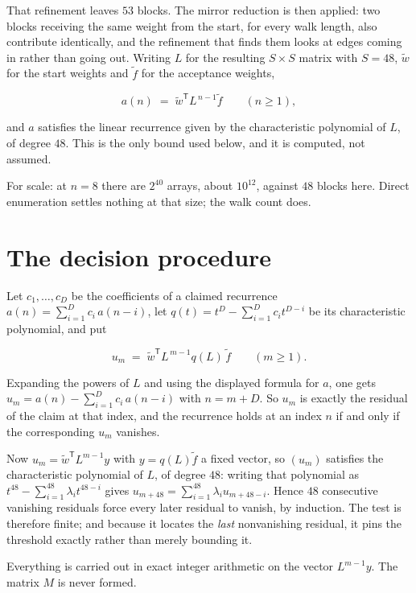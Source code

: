 \documentclass[11pt]{article}
\theoremstyle{definition}
\begin{document}
That refinement leaves $53$ blocks. The mirror reduction is then applied: two blocks receiving the same weight from the start, for every walk length, also contribute identically, and the refinement that finds them looks at edges coming in rather than going out. Writing $L$ for the resulting $S \times S$ matrix with $S = 48$, $\tilde w$ for the start weights and $\tilde f$ for the acceptance weights,

\[a(n) \;=\; \tilde w^{\mathsf T} L^{\,n-1} \tilde f \qquad (n \ge 1),\]

and $a$ satisfies the linear recurrence given by the characteristic polynomial of $L$, of degree $48$. This is the only bound used below, and it is computed, not assumed.

For scale: at $n = 8$ there are $2^{40}$ arrays, about $10^{12}$, against $48$ blocks here. Direct enumeration settles nothing at that size; the walk count does.

\section{The decision procedure}

Let $c_1,\dots,c_D$ be the coefficients of a claimed recurrence $a(n) = \sum_{i=1}^{D} c_i\,a(n-i)$, let $q(t) = t^{D} - \sum_{i=1}^{D} c_i t^{D-i}$ be its characteristic polynomial, and put

\[u_m \;=\; \tilde w^{\mathsf T} L^{\,m-1} q(L)\,\tilde f \qquad (m \ge 1).\]

Expanding the powers of $L$ and using the displayed formula for $a$, one gets $u_m = a(n) - \sum_{i=1}^{D} c_i\,a(n-i)$ with $n = m + D$. So $u_m$ is exactly the residual of the claim at that index, and the recurrence holds at an index $n$ if and only if the corresponding $u_m$ vanishes.

Now $u_m = \tilde w^{\mathsf T} L^{m-1} y$ with $y = q(L)\tilde f$ a fixed vector, so $(u_m)$ satisfies the characteristic polynomial of $L$, of degree $48$: writing that polynomial as $t^{48} - \sum_{i=1}^{48} \lambda_i t^{48-i}$ gives $u_{m+48} = \sum_{i=1}^{48} \lambda_i u_{m+48-i}$. Hence $48$ consecutive vanishing residuals force every later residual to vanish, by induction. The test is therefore finite; and because it locates the {\itshape last} nonvanishing residual, it pins the threshold exactly rather than merely bounding it.

Everything is carried out in exact integer arithmetic on the vector $L^{m-1}y$. The matrix $M$ is never formed.
\end{document}
